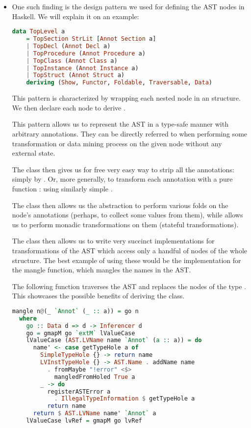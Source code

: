 \begin{itemize}
    \item One such finding is the design pattern we used for defining the AST nodes in Haskell. We will explain it on an example:

    \begin{lstlisting}[language=Haskell]
data TopLevel a
    = TopSection StrLit [Annot Section a]
    | TopDecl (Annot Decl a)
    | TopProcedure (Annot Procedure a)
    | TopClass (Annot Class a)
    | TopInstance (Annot Instance a)
    | TopStruct (Annot Struct a)
    deriving (Show, Functor, Foldable, Traversable, Data)
    \end{lstlisting}

    This pattern is characterized by wrapping each nested node  in an  structure. We then declare each node to derive \linebreak{}.

    This pattern allows us to represent the AST in a type-safe manner with arbitrary annotations. They can be directly referred to when performing some transformation or data mining process on the given node without  any external state.

    The  class then gives us for free very easy way to strip all the annotations: simply by . Or, more generally, to transform each annotation with a pure function : using similarly simple .

    The  class then allows us the abstraction to perform various folds on the node's annotations (perhaps, to collect some values from them), while  allows us to perform monadic transformations on them (stateful transformations).

    The  class then allows us to write very succinct implementations for transformations of the AST which access only a handful of nodes of the whole structure. The best example of using these would be the implementation for the mangle function, which mangles the names in the AST.

    \begin{ex}
        The following function traverses the AST and replaces the nodes of the type . This showcases the possible benefits of deriving the  class.

        \begin{lstlisting}[language=Haskell]
mangle n@(_ `Annot` (_ :: a)) = go n
  where
    go :: Data d => d -> Inferencer d
    go = gmapM go `extM` lValueCase
    lValueCase (AST.LVName name `Annot` (a :: a)) = do
      name' <- case getTypeHole a of
        SimpleTypeHole {} -> return name
        LVInstTypeHole {} -> AST.Name . addName name
          . fromMaybe "!error" <$>
            mangledFromHoled True a
        _ -> do
          registerASTError a
            . IllegalTypeInformation $ getTypeHole a
          return name
      return $ AST.LVName name' `Annot` a
    lValueCase lvRef = gmapM go lvRef
        \end{lstlisting}


\end{ex}
\end{itemize}
